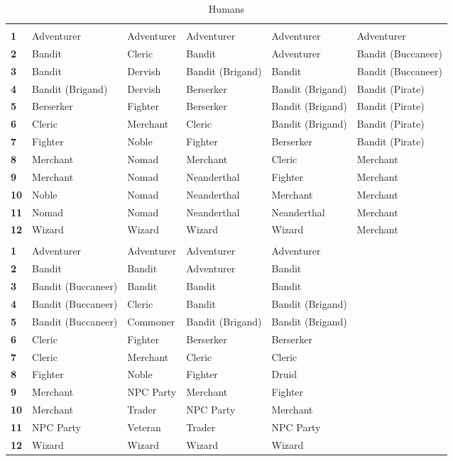 \begin {table}[H]
  \caption{Humans}
  \begin{tabularx}{\columnwidth}{>{\bfseries}YYYYYY}
	 &  &  &  &  & \\
	1 & Adventurer & Adventurer & Adventurer & Adventurer & Adventurer\\
	2 & Bandit & Cleric & Bandit & Adventurer & Bandit (Buccaneer)\\
	3 & Bandit & Dervish & Bandit (Brigand) & Bandit & Bandit (Buccaneer)\\
	4 & Bandit (Brigand) & Dervish & Berserker & Bandit (Brigand) & Bandit (Pirate)\\
	5 & Berserker & Fighter & Berserker & Bandit (Brigand) & Bandit (Pirate)\\
	6 & Cleric & Merchant & Cleric & Bandit (Brigand) & Bandit (Pirate)\\
	7 & Fighter & Noble & Fighter & Berserker & Bandit (Pirate)\\
	8 & Merchant & Nomad & Merchant & Cleric & Merchant\\
	9 & Merchant & Nomad & Neanderthal & Fighter & Merchant\\
	10 & Noble & Nomad & Neanderthal & Merchant & Merchant\\
	11 & Nomad & Nomad & Neanderthal & Neanderthal & Merchant\\
	12 & Wizard & Wizard & Wizard & Wizard & Merchant\\
	 &  &  &  & \\
	1 & Adventurer & Adventurer & Adventurer & Adventurer\\
	2 & Bandit & Bandit & Adventurer & Bandit\\
	3 & Bandit (Buccaneer) & Bandit & Bandit & Bandit\\
	4 & Bandit (Buccaneer) & Cleric & Bandit & Bandit (Brigand)\\
	5 & Bandit (Buccaneer) & Commoner & Bandit (Brigand) & Bandit (Brigand)\\
	6 & Cleric & Fighter & Berserker & Berserker\\
	7 & Cleric & Merchant & Cleric & Cleric\\
	8 & Fighter & Noble & Fighter & Druid\\
	9 & Merchant & NPC Party & Merchant & Fighter\\
	10 & Merchant & Trader & NPC Party & Merchant\\
	11 & NPC Party & Veteran & Trader & NPC Party\\
	12 & Wizard & Wizard & Wizard & Wizard
  \end {tabularx}
\end {table}

